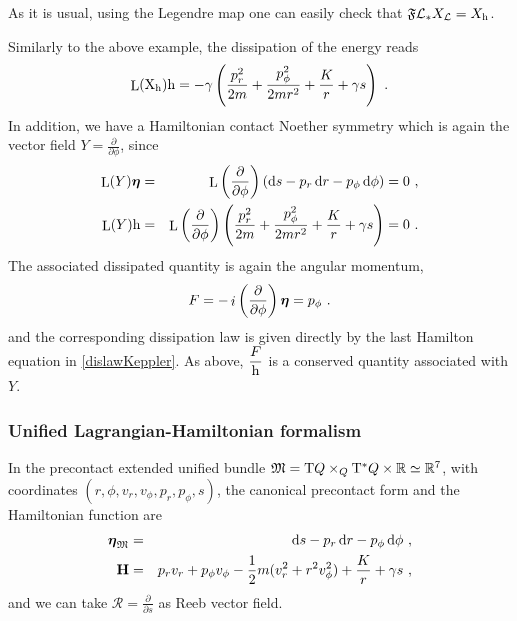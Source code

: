 \documentclass[12pt]{report}
\def\beann{\begin{eqnarray*}}
\def\eeann{\end{eqnarray*}}
\def\dst{\displaystyle}
\def\derpar#1#2{\frac{\partial{#1}}{\partial{#2}}}
\def\Lag{{\cal L}}
\def\d{{\rm d}}
\def\Real{\mathbb{R}}
\def\bmeta{\mbox{\boldmath $\eta$}}
\def\X{{\rm X}}
\def\Tan{{\rm T}}
\def\Lie{\mathop{\rm L}\nolimits}
\def\inn{\mathop{i}\nolimits}
\newcommand{\Reeb}{\mathcal{R}}
\begin{document}
As it is usual, using the Legendre map
one can easily check that $\mathfrak{F}\Lag_*X_\Lag=X_{\rm h}$.

Similarly to the above example,
the dissipation of the energy reads
$$
\Lie(\X_{\rm h}){\rm h}=-\gamma \left(\frac{p_r^2}{2m}+\frac{p_\phi^2}{2mr^2}+\frac{K}{r}+\gamma s\right)\ .
$$
In addition, we have a Hamiltonian contact Noether symmetry which is again the
vector field $\dst Y=\derpar{}{\phi}$, since
\beann
\Lie(Y)\bmeta&=& 
\Lie\left(\derpar{}{\phi}\right)\left(\d s-p_r\,\d r-p_\phi\,\d\phi\right) =0 \ , 
\\
\Lie(Y){\rm h}&=& 
\Lie\left(\derpar{}{\phi}\right)\left(\frac{p_r^2}{2m}+\frac{p_\phi^2}{2mr^2}+\frac{K}{r}+\gamma s\right)=0 \ .
\eeann
The associated dissipated quantity is again the angular momentum,
$$
F=-\inn\left(\derpar{}{\phi}\right)\bmeta=p_\phi \ .
$$
and the corresponding dissipation law is given directly by the last Hamilton equation in \eqref{dislawKeppler}.
As above, $\dst\frac{F}{{\rm h}}$ is a conserved quantity associated with $Y$.

\subsubsection{Unified Lagrangian-Hamiltonian formalism}

In the precontact extended unified bundle
$\mathfrak{M}=\Tan Q\times_Q\Tan^*Q\times\Real\simeq\Real^7$,
with coordinates $(r,\phi,v_r,v_\phi,p_r,p_\phi,s)$, 
the canonical precontact form and the Hamiltonian function are
\beann
\bmeta_{\mathfrak{M}}&=&\d s-p_r\,\d r-p_\phi\,\d\phi \ , \\
{\bf H}&=&p_rv_r+p_\phi v_\phi-\frac{1}{2}m(v_r^2+r^2v_\phi^2)+\frac{K}{r}+\gamma s \ ,
\eeann
and we can take $\dst \Reeb=\derpar{}{s}$ as Reeb vector field.
\end{document}
